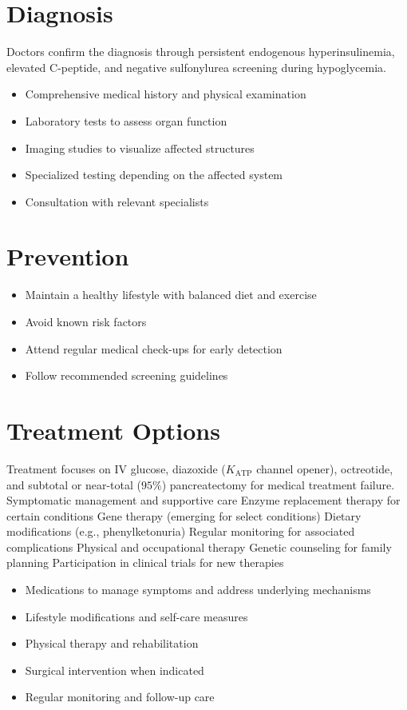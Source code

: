 \section{Diagnosis}
Doctors confirm the diagnosis through persistent endogenous hyperinsulinemia, elevated C-peptide, and negative sulfonylurea screening during hypoglycemia.

\begin{itemize}[noitemsep]
  \item Comprehensive medical history and physical examination
  \item Laboratory tests to assess organ function
  \item Imaging studies to visualize affected structures
  \item Specialized testing depending on the affected system
  \item Consultation with relevant specialists
\end{itemize}
\section{Prevention}
\begin{itemize}[noitemsep]
  \item Maintain a healthy lifestyle with balanced diet and exercise
  \item Avoid known risk factors
  \item Attend regular medical check-ups for early detection
  \item Follow recommended screening guidelines
\end{itemize}
\section{Treatment Options}
Treatment focuses on IV glucose, diazoxide ($K_{\text{ATP}}$ channel opener), octreotide, and subtotal or near-total ($95\%$) pancreatectomy for medical treatment failure. Symptomatic management and supportive care Enzyme replacement therapy for certain conditions Gene therapy (emerging for select conditions) Dietary modifications (e.g., phenylketonuria) Regular monitoring for associated complications Physical and occupational therapy Genetic counseling for family planning Participation in clinical trials for new therapies

\begin{itemize}[noitemsep]
  \item Medications to manage symptoms and address underlying mechanisms
  \item Lifestyle modifications and self-care measures
  \item Physical therapy and rehabilitation
  \item Surgical intervention when indicated
  \item Regular monitoring and follow-up care
\end{itemize}
